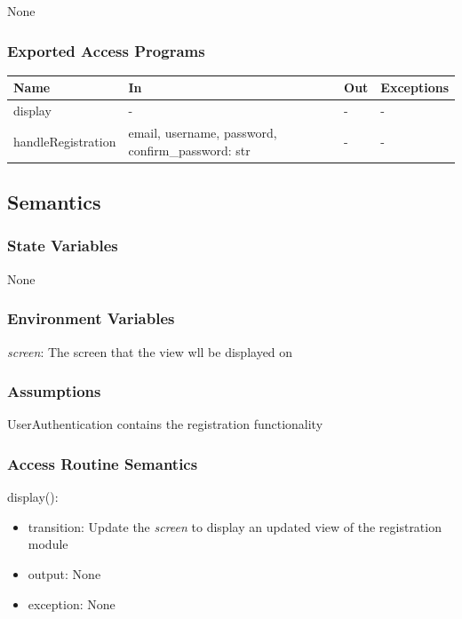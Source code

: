 \documentclass[12pt, titlepage]{article}
\begin{document}
None

\subsubsection{Exported Access Programs}

\begin{center}
\begin{tabular}{p{4cm} p{5cm} p{2cm} p{2cm}}
\hline
\textbf{Name} & \textbf{In} & \textbf{Out} & \textbf{Exceptions} \\
\hline
display & - & - & - \\
handleRegistration & email, username, password, confirm\_password: str & - & - \\
\hline
\end{tabular}
\end{center}

\subsection{Semantics}

\subsubsection{State Variables}

None

\subsubsection{Environment Variables}

\textit{screen}: The screen that the view wll be displayed on

\subsubsection{Assumptions}

UserAuthentication contains the registration functionality

\subsubsection{Access Routine Semantics}

\noindent display():
\begin{itemize}
\item transition: Update the \textit{screen} to display an updated view of the registration module
\item output: None
\item exception: None
\end{itemize}
\end{document}
